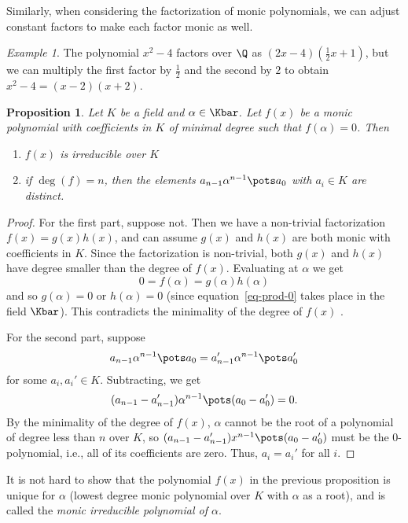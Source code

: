 \documentclass[12pt]{amsart}
\theoremstyle{plain}
\newtheorem{prop}[thm]{Proposition}
\theoremstyle{definition}
\theoremstyle{remark}
\newtheorem*{exam}{Example}
\begin{document}
Similarly, when considering the factorization of monic polynomials, we
can adjust constant factors to make each factor monic as well.
\begin{exam}
  The polynomial $x^2-4$ factors over $\Q$ as $(2x-4)(\frac12 x+1)$,
  but we can multiply the first factor by $\frac12$ and the second by
  $2$ to obtain $x^2-4=(x-2)(x+2)$.
\end{exam}
\begin{prop}
  Let $K$ be a field and $\alpha\in\Kbar$.  Let $f(x)$ be a
  monic polynomial with coefficients in $K$ of minimal degree
  such that $f(\alpha)=0$.  Then
  \begin{enumerate}
  \item $f(x)$ is irreducible over $K$
  \item if $\deg(f) = n$, then the elements $a_{n-1}\alpha^{n-1}\pots
    a_0$ with $a_i\in K$ are distinct.
  \end{enumerate}
\end{prop}
\begin{proof}
  For the first part, suppose not.  Then we have a non-trivial
  factorization $f(x)=g(x)h(x)$, and can assume $g(x)$ and $h(x)$ are
  both monic with coefficients in $K$.  Since the factorization is
  non-trivial, both $g(x)$ and $h(x)$ have degree smaller than the
  degree of $f(x)$.  Evaluating at $\alpha$ we get
  \begin{equation} \label{eq-prod-0}
    0 = f(\alpha) = g(\alpha)h(\alpha)
  \end{equation}
  and so $g(\alpha)=0$ or $h(\alpha)=0$ (since
  equation~\eqref{eq-prod-0} takes place in the field $\Kbar$).  This
  contradicts the minimality of the degree of $f(x)$ \con.

  For the second part, suppose
  \[ a_{n-1}\alpha^{n-1}\pots a_0 = a_{n-1}'\alpha^{n-1}\pots a_0'\]
  for some $a_i, a_i'\in K$.  Subtracting, we get
  \[(a_{n-1}-a_{n-1}')\alpha^{n-1}\pots (a_0-a_0')=0.\]
  By the minimality of the degree of $f(x)$, $\alpha$ cannot be the
  root of a polynomial of degree less than $n$ over $K$, so
  $(a_{n-1}-a_{n-1}')x^{n-1}\pots (a_0-a_0')$ must be the
  $0$-polynomial, i.e., all of its coefficients are zero.  Thus,
  $a_i=a_i'$ for all $i$.
\end{proof}
It is not hard to show that the polynomial $f(x)$ in the previous
proposition is unique for $\alpha$ (lowest degree monic polynomial
over $K$ with $\alpha$ as a root), and is called the \emph{monic
  irreducible polynomial of $\alpha$}.
\end{document}
